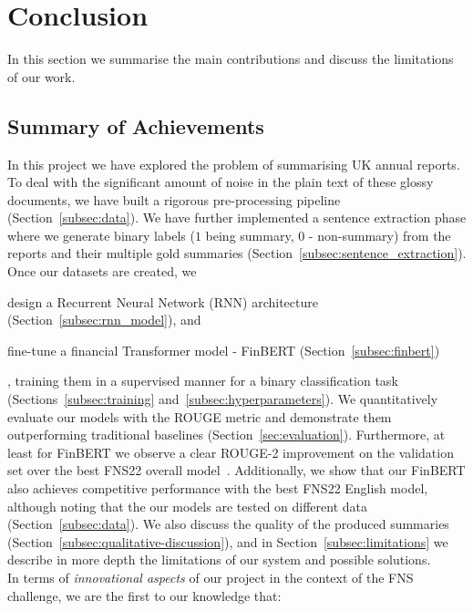 \newpage

\section{Conclusion}\label{sec:conclusion}
In this section we summarise the main contributions and discuss the limitations of our work.

\subsection{Summary of Achievements}\label{subsec:summary}
In this project we have explored the problem of summarising UK annual reports.
To deal with the significant amount of noise in the plain text of these glossy documents, we have built a rigorous pre-processing pipeline (Section~\ref{subsec:data}).
We have further implemented a sentence extraction phase where we generate binary labels ($1$ being summary, $0$ - non-summary) from the reports and their multiple gold summaries (Section~\ref{subsec:sentence_extraction}).
Once our datasets are created, we
\begin{enumerate*}[label=\Alph*]
    \item design a Recurrent Neural Network (RNN) architecture (Section~\ref{subsec:rnn_model}), and
    \item fine-tune a financial Transformer model - FinBERT (Section~\ref{subsec:finbert})
\end{enumerate*},
training them in a supervised manner for a binary classification task (Sections~\ref{subsec:training} and~\ref{subsec:hyperparameters}).
We quantitatively evaluate our models with the ROUGE metric and demonstrate them outperforming traditional baselines (Section~\ref{sec:evaluation}).
Furthermore, at least for FinBERT we observe a clear ROUGE-2 improvement on the validation set over the best FNS22 overall model~\cite{foroutan-etal-2022-multilingual}.
Additionally, we show that our FinBERT also achieves competitive performance with the best FNS22 English model,
although noting that the our models are tested on different data (Section~\ref{subsec:data}).
We also discuss the quality of the produced summaries (Section~\ref{subsec:qualitative-discussion}), and in
Section~\ref{subsec:limitations} we describe in more depth the limitations of our system and possible solutions.
\\
In terms of \emph{innovational aspects} of our project in the context of the FNS challenge, we are the first to our knowledge that:
